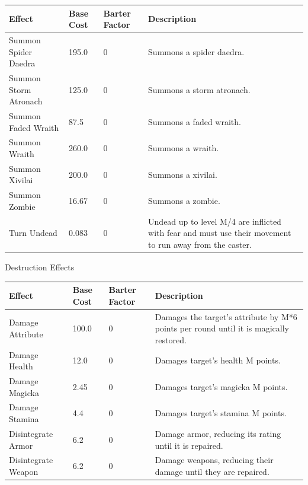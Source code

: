 \documentclass[12pt]{book}
\begin{document}
\begin{tabular}{p{}|p{}|p{}|p{}}
Effect & Base Cost & Barter Factor & Description\\ \hline
Summon Spider Daedra & 195.0 & 0 & Summons a spider daedra.\\ \hline
Summon Storm Atronach & 125.0 & 0 & Summons a storm atronach.\\ \hline
Summon Faded Wraith & 87.5 & 0 & Summons a faded wraith.\\ \hline
Summon Wraith & 260.0 & 0 & Summons a wraith.\\ \hline
Summon Xivilai & 200.0 & 0 & Summons a xivilai.\\ \hline
Summon Zombie & 16.67 & 0 & Summons a zombie.\\ \hline
Turn Undead & 0.083 & 0 & Undead up to level M/4 are inflicted with fear and must use their movement to run away from the caster.\\
\end{tabular}

Destruction Effects

\begin{tabular}{p{}|p{}|p{}|p{}}
Effect & Base Cost & Barter Factor & Description\\ \hline
Damage Attribute & 100.0 & 0 & Damages the target's attribute by M*6 points per round until it is magically restored.\\ \hline
Damage Health & 12.0 & 0 & Damages target's health M points.\\ \hline
Damage Magicka & 2.45 & 0 & Damages target's magicka M points.\\ \hline
Damage Stamina & 4.4 & 0 & Damages target's stamina M points.\\ \hline
Disintegrate Armor & 6.2 & 0 & Damage armor, reducing its rating until it is repaired.\\ \hline
Disintegrate Weapon & 6.2 & 0 & Damage weapons, reducing their damage until they are repaired.\\
\end{tabular}
\end{document}
